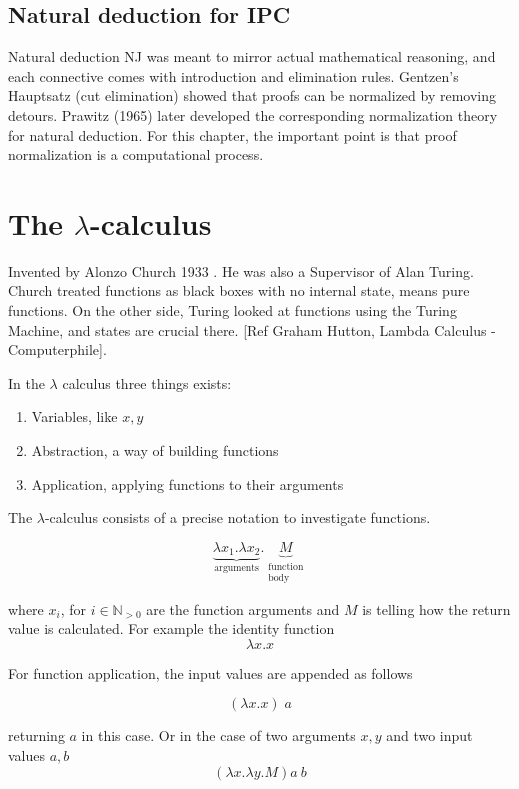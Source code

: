 \subsection{Natural deduction for IPC}
\label{s:intuitionistic_logic}

Natural deduction NJ was meant to mirror actual mathematical reasoning, and each connective comes with introduction and elimination rules. Gentzen’s Hauptsatz (cut elimination) showed that proofs can be normalized by removing detours. Prawitz (1965) later developed the corresponding normalization theory for natural deduction. For this chapter, the important point is that proof normalization is a computational process.



\section{\texorpdfstring{The $\lambda$-calculus}{The lambda-calculus}}
Invented by Alonzo Church 1933 . He was also a Supervisor of Alan Turing. Church treated functions as black boxes with no
internal state, means pure functions. On the other side, Turing looked at functions using the Turing Machine,
and states are crucial there. [Ref Graham Hutton, Lambda Calculus - Computerphile].

In the $\lambda$ calculus three things exists: 
\begin{enumerate}
    \item Variables, like $x,y$
    \item Abstraction, a way of building functions
    \item Application, applying functions to their arguments
\end{enumerate}


The $\lambda$-calculus consists of a precise notation to investigate functions.


\[
\underbrace{\lambda x_1.\lambda x_2}_{\text{arguments}}
.\underbrace{M}_{\substack{\text{function}\\[2pt]\text{body}}}
\]

where $x_i$, for $i \in \mathbb{N}_{>0}$ are the function arguments and $M$ is telling how the return value is calculated. For example the identity function
$$\lambda x.x$$

For function application, the input values are appended as follows

$$(
\lambda x.x) \;a
$$

returning $a$ in this case. Or in the case of two arguments $x,y$ and two input values $a,b$
$$
(\lambda x.\lambda y.M) a \: b
$$

